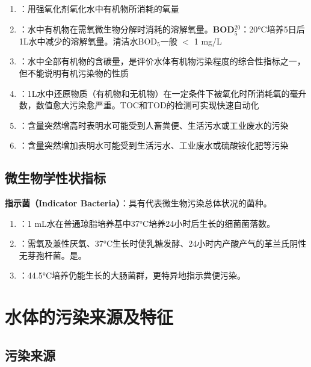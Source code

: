 \begin{keybox}
\begin{enumerate}[leftmargin=*]
    \item {}：用强氧化剂氧化水中有机物所消耗的氧量
    \item {}：水中有机物在需氧微生物分解时消耗的溶解氧量。\textbf{BOD$_5^{20}$}：20°C培养5日后1L水中减少的溶解氧量。清洁水BOD$_5$一般 $<$ 1 mg/L
    \item {}：水中全部有机物的含碳量，是评价水体有机物污染程度的综合性指标之一，但不能说明有机污染物的性质
    \item {}：1L水中还原物质（有机物和无机物）在一定条件下被氧化时所消耗氧的毫升数，数值愈大污染愈严重。TOC和TOD的检测可实现快速自动化
    \item {}：含量突然增高时表明水可能受到人畜粪便、生活污水或工业废水的污染
    \item {}：含量突然增加表明水可能受到生活污水、工业废水或硫酸铵化肥等污染
\end{enumerate}
\end{keybox}

\subsection{微生物学性状指标}

\begin{defbox}
\textbf{指示菌（Indicator Bacteria）}：具有代表微生物污染总体状况的菌种。
\end{defbox}

\begin{enumerate}[leftmargin=*]
    \item {}：1 mL水在普通琼脂培养基中37°C培养24小时后生长的细菌菌落数。
    \item {}：需氧及兼性厌氧、37°C生长时使乳糖发酵、24小时内产酸产气的革兰氏阴性无芽孢杆菌。是。
    \item {}：44.5°C培养仍能生长的大肠菌群，更特异地指示粪便污染。
\end{enumerate}

\section{水体的污染来源及特征}

\subsection{污染来源}

